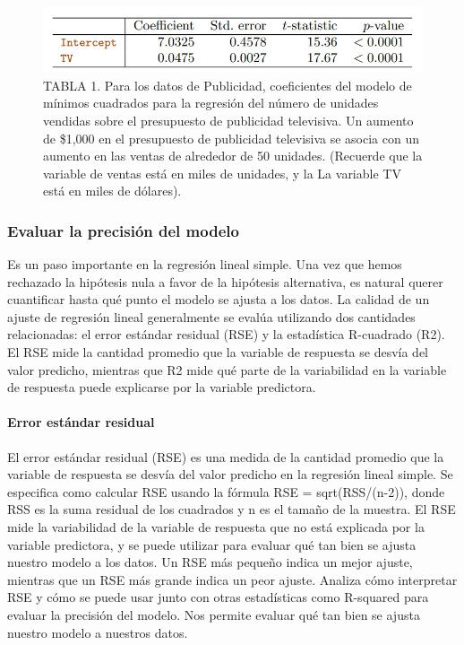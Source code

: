 \documentclass[
  letterpaper,
  DIV=11,
  numbers=noendperiod]{scrartcl}
\let\oldparagraph\paragraph
\renewcommand{\paragraph}[1]{\oldparagraph{#1}\mbox{}}
\begin{document}
\begin{figure}

{\centering \includegraphics{images/tabl1.jpg}

}

\caption{TABLA 1. Para los datos de Publicidad, coeficientes del modelo
de mínimos cuadrados para la regresión del número de unidades vendidas
sobre el presupuesto de publicidad televisiva. Un aumento de \$1,000 en
el presupuesto de publicidad televisiva se asocia con un aumento en las
ventas de alrededor de 50 unidades. (Recuerde que la variable de ventas
está en miles de unidades, y la La variable TV está en miles de
dólares).}

\end{figure}

\hypertarget{evaluar-la-precisiuxf3n-del-modelo}{%
\subsubsection{Evaluar la precisión del
modelo}\label{evaluar-la-precisiuxf3n-del-modelo}}

Es un paso importante en la regresión lineal simple. Una vez que hemos
rechazado la hipótesis nula a favor de la hipótesis alternativa, es
natural querer cuantificar hasta qué punto el modelo se ajusta a los
datos. La calidad de un ajuste de regresión lineal generalmente se
evalúa utilizando dos cantidades relacionadas: el error estándar
residual (RSE) y la estadística R-cuadrado (R2). El RSE mide la cantidad
promedio que la variable de respuesta se desvía del valor predicho,
mientras que R2 mide qué parte de la variabilidad en la variable de
respuesta puede explicarse por la variable predictora.

\hypertarget{error-estuxe1ndar-residual}{%
\paragraph{Error estándar residual}\label{error-estuxe1ndar-residual}}

El error estándar residual (RSE) es una medida de la cantidad promedio
que la variable de respuesta se desvía del valor predicho en la
regresión lineal simple. Se especifica como calcular RSE usando la
fórmula RSE = sqrt(RSS/(n-2)), donde RSS es la suma residual de los
cuadrados y n es el tamaño de la muestra. El RSE mide la variabilidad de
la variable de respuesta que no está explicada por la variable
predictora, y se puede utilizar para evaluar qué tan bien se ajusta
nuestro modelo a los datos. Un RSE más pequeño indica un mejor ajuste,
mientras que un RSE más grande indica un peor ajuste. Analiza cómo
interpretar RSE y cómo se puede usar junto con otras estadísticas como
R-squared para evaluar la precisión del modelo. Nos permite evaluar qué
tan bien se ajusta nuestro modelo a nuestros datos.
\end{document}
